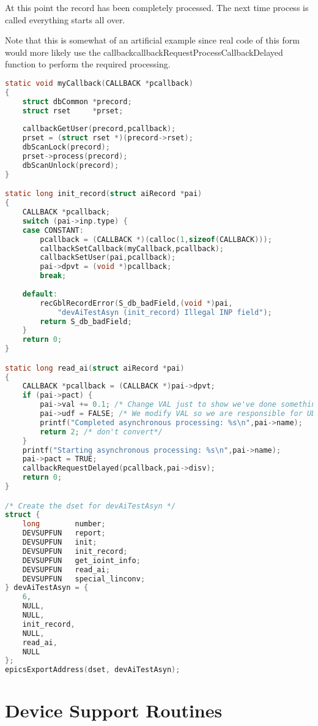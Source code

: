 At this point the record has been completely processed.
The next time process is called everything starts all over.

Note that this is somewhat of an artificial example since real code of this form would more likely use the callbackcallbackRequestProcessCallbackDelayed function to perform the required processing.

\begin{lstlisting}[language=C]
static void myCallback(CALLBACK *pcallback)
{
    struct dbCommon *precord;
    struct rset     *prset;
    
    callbackGetUser(precord,pcallback);
    prset = (struct rset *)(precord->rset);
    dbScanLock(precord);
    prset->process(precord);
    dbScanUnlock(precord);
}

static long init_record(struct aiRecord *pai)
{
    CALLBACK *pcallback;
    switch (pai->inp.type) {
    case CONSTANT:
        pcallback = (CALLBACK *)(calloc(1,sizeof(CALLBACK)));
        callbackSetCallback(myCallback,pcallback);
        callbackSetUser(pai,pcallback);
        pai->dpvt = (void *)pcallback;
        break;
    
    default:
        recGblRecordError(S_db_badField,(void *)pai,
            "devAiTestAsyn (init_record) Illegal INP field");
        return S_db_badField;
    }
    return 0;
}

static long read_ai(struct aiRecord *pai)
{
    CALLBACK *pcallback = (CALLBACK *)pai->dpvt;
    if (pai->pact) {
        pai->val += 0.1; /* Change VAL just to show we've done something. */
        pai->udf = FALSE; /* We modify VAL so we are responsible for UDF too. */
        printf("Completed asynchronous processing: %s\n",pai->name);
        return 2; /* don't convert*/
    } 
    printf("Starting asynchronous processing: %s\n",pai->name);
    pai->pact = TRUE;
    callbackRequestDelayed(pcallback,pai->disv);
    return 0;
}

/* Create the dset for devAiTestAsyn */
struct {
    long        number;
    DEVSUPFUN   report;
    DEVSUPFUN   init;
    DEVSUPFUN   init_record;
    DEVSUPFUN   get_ioint_info;
    DEVSUPFUN   read_ai;
    DEVSUPFUN   special_linconv;
} devAiTestAsyn = {
    6,
    NULL,
    NULL,
    init_record,
    NULL,
    read_ai,
    NULL
};
epicsExportAddress(dset, devAiTestAsyn);
\end{lstlisting}

\section{Device Support Routines}

